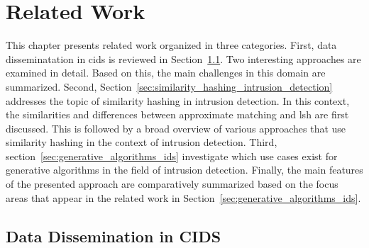 \documentclass[../../main.tex]{subfiles}
\begin{document}
\chapter{Related Work}

This chapter presents related work organized in three categories. First, data disseminatation in \gls{cids} is reviewed in Section~\ref{sec:data_disseminatation_cids}. Two interesting approaches are examined in detail. Based on this, the main challenges in this domain are summarized. Second, Section~\ref{sec:similarity_hashing_intrusion_detection} addresses the topic of similarity hashing in intrusion detection. In this context, the similarities and differences between approximate matching and \gls{lsh} are first discussed. This is followed by a broad overview of various approaches that use similarity hashing in the context of intrusion detection. Third, section~\ref{sec:generative_algorithms_ids} investigate which use cases exist for generative algorithms in the field of intrusion detection. Finally, the main features of the presented approach are comparatively summarized based on the focus areas that appear in the related work in Section~\ref{sec:generative_algorithms_ids}.

\newpage
\section{Data Dissemination in CIDS}\label{sec:data_disseminatation_cids}
\end{document}
